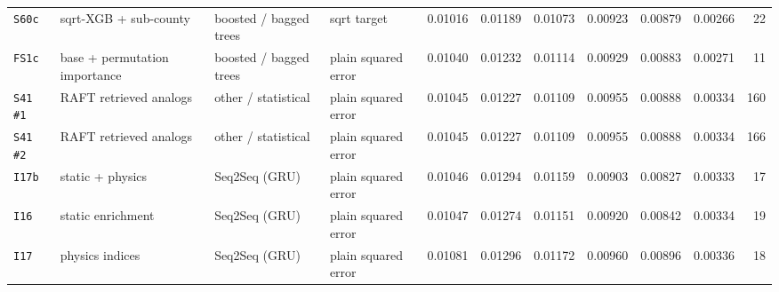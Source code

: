 \documentclass[9pt,landscape]{article}
\begin{document}
\begin{longtable}{@{}p{1.1cm}p{5.4cm}p{3.1cm}p{2.7cm}rrrrrrr@{}}
\texttt{S60c} & sqrt-XGB + sub-county & boosted / bagged trees & sqrt target & 0.01016 & 0.01189 & 0.01073 & 0.00923 & 0.00879 & 0.00266 & 22 \\
\texttt{FS1c} & base + permutation importance & boosted / bagged trees & plain squared error & 0.01040 & 0.01232 & 0.01114 & 0.00929 & 0.00883 & 0.00271 & 11 \\
\texttt{S41 \#1} & RAFT retrieved analogs & other / statistical & plain squared error & 0.01045 & 0.01227 & 0.01109 & 0.00955 & 0.00888 & 0.00334 & 160 \\
\texttt{S41 \#2} & RAFT retrieved analogs & other / statistical & plain squared error & 0.01045 & 0.01227 & 0.01109 & 0.00955 & 0.00888 & 0.00334 & 166 \\
\texttt{I17b} & static + physics & Seq2Seq (GRU) & plain squared error & 0.01046 & 0.01294 & 0.01159 & 0.00903 & 0.00827 & 0.00333 & 17 \\
\texttt{I16} & static enrichment & Seq2Seq (GRU) & plain squared error & 0.01047 & 0.01274 & 0.01151 & 0.00920 & 0.00842 & 0.00334 & 19 \\
\texttt{I17} & physics indices & Seq2Seq (GRU) & plain squared error & 0.01081 & 0.01296 & 0.01172 & 0.00960 & 0.00896 & 0.00336 & 18 \\
\bottomrule\end{longtable}
\end{document}
